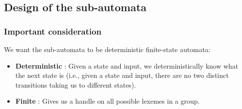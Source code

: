 \subsection{Design of the sub-automata}

\subsubsection{Important consideration}

We want the sub-automata to be deterministic finite-state automata:

\begin{itemize}
    \item \textbf{Deterministic} : Given a state and input, we deterministically know what the next state is (i.e., given a state and input, there are no two distinct transitions taking us to different states). 
    \item \textbf{Finite} : Gives us a handle on all possible lexemes in a group.
\end{itemize}

\vskip 0.2in
